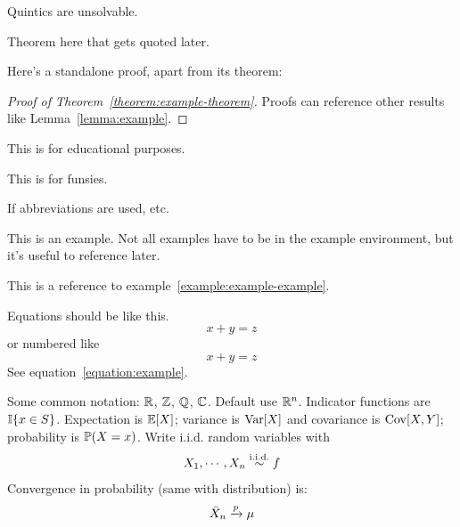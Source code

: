 \documentclass[../../main.tex]{subfiles}
\begin{document}
\begin{theorem}
    Quintics are unsolvable.
\end{theorem}

\begin{theorem}\label{theorem:example-theorem}
    Theorem here that gets quoted later.
\end{theorem}

Here's a standalone proof, apart from its theorem:
\begin{proof}[Proof of Theorem~\ref{theorem:example-theorem}]
    Proofs can reference other results like Lemma~\ref{lemma:example}.
\end{proof}

\begin{remark}
    This is for educational purposes.
\end{remark}

\begin{aside}
    This is for funsies.
\end{aside}

\begin{notation}
    If abbreviations are used, etc.
\end{notation}

\begin{example}\label{example:example-example}
    This is an example. Not all examples have to be in the example environment, but it's useful to reference later.
\end{example}

This is a reference to example~\ref{example:example-example}.

Equations should be like this.
\begin{equation*}
    x+y=z
\end{equation*}
or numbered like
\begin{equation}\label{equation:example}
    x+y=z
\end{equation}
See equation~\eqref{equation:example}.
\newline

Some common notation: $\mathbb{R}$, $\mathbb{Z}$, $\mathbb{Q}$, $\mathbb{C}$. Default use $\mathbb{R}^n$. Indicator functions are $\mathbb{I}\{x\in S\}$. Expectation is $\mathbb{E}[X]$; variance is $\operatorname{Var}[X]$ and covariance is $\operatorname{Cov}[X,Y]$; probability is $\mathbb{P}(X=x)$.
Write i.i.d. random variables with
\begin{equation*}
    X_1,\cdots,X_n \overset{\mathrm{i.i.d.}}{\sim} f
\end{equation*}
Convergence in probability (same with distribution) is:
\begin{equation*}
    \bar X_n\xrightarrow{p} \mu
\end{equation*}
\end{document}
